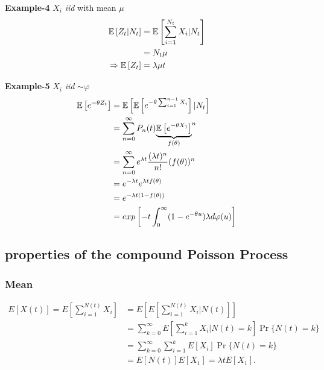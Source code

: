 \documentclass[a4paper,english,10pt]{article}
\begin{document}
\textbf{Example-4} $X_i$ \emph{iid} with mean $\mu$
\begin{align*}
	\mathbb{E}\left[Z_t|N_t\right]&=\mathbb{E}\left[\sum_{i=1}^{N_t}X_i|N_t\right]\\
	&= N_t\mu\\
	\Rightarrow \mathbb{E}\left[Z_t\right]&=\lambda \mu t
\end{align*}

\textbf{Example-5} $X_i$ \emph{iid} $\sim \varphi$
\begin{align*}
	\mathbb{E}\left[e^{-\theta Z_t}\right] &= \mathbb{E}\left[\mathbb{E}\left[e^{-\theta\sum_{i=1}^{n-1}X_i}\right]|N_t\right]\\
	&= \sum_{n=0}^{\infty}P_n(t){\underbrace{\mathbb{E}\left[e^{-\theta X_1}\right]}_{f(\theta)}}^n\\
	&= \sum_{n=0}^{\infty}e^{\lambda t}\frac{(\lambda t)^n}{n!}(f(\theta))^n\\
	&= e^{-\lambda t}e^{\lambda t f(\theta)}\\
	&= e^{-\lambda t (1-f(\theta))}\\
	&= exp\left[-t\int_{0}^{\infty}(1-e^{-\theta u})\lambda d\varphi(u)\right]
\end{align*}

\subsection{properties of the compound Poisson Process}
\subsubsection{Mean}
\begin{align*}
	E[X(t)] = E[\sum_{i=1}^{N(t)} X_i] &= E[E[\sum_{i=1}^{N(t)} X_i|N(t)]] \\
	&= \sum_{k=0}^\infty E\left[\sum_{i=1}^{k} X_i|N(t)=k\right]\Pr\{N(t) = k\}\\
	&= \sum_{k=0}^\infty \sum_{i=1}^{k} E[X_i]\Pr\{N(t) = k\}\\
	&= E[N(t)]E[X_1] = \lambda tE[X_1].
\end{align*}
\end{document}
